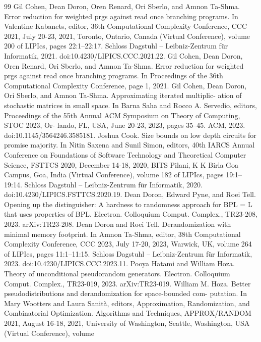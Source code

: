 \documentclass[10pt,a4paper]{article}
\begin{document}
\begin{thebibliography}{99}
 Gil Cohen, Dean Doron, Oren Renard, Ori Sberlo, and Amnon Ta-Shma. Error reduction for weighted prgs against read once branching programs. In Valentine Kabanets, editor, 36th Computational Complexity Conference, CCC 2021, July 20-23, 2021, Toronto, Ontario, Canada (Virtual Conference), volume 200 of LIPIcs, pages 22:1–22:17. Schloss Dagstuhl – Leibniz-Zentrum für Informatik, 2021. doi:10.4230/LIPICS.CCC.2021.22.
 Gil Cohen, Dean Doron, Oren Renard, Ori Sberlo, and Amnon Ta-Shma. Error reduction for weighted prgs against read once branching programs. In Proceedings of the 36th Computational Complexity Conference, page 1, 2021.
 Gil Cohen, Dean Doron, Ori Sberlo, and Amnon Ta-Shma. Approximating iterated multiplic- ation of stochastic matrices in small space. In Barna Saha and Rocco A. Servedio, editors, Proceedings of the 55th Annual ACM Symposium on Theory of Computing, STOC 2023, Or- lando, FL, USA, June 20-23, 2023, pages 35–45. ACM, 2023. doi:10.1145/3564246.3585181.
 Joshua Cook. Size bounds on low depth circuits for promise majority. In Nitin Saxena and Sunil Simon, editors, 40th IARCS Annual Conference on Foundations of Software Technology and Theoretical Computer Science, FSTTCS 2020, December 14-18, 2020, BITS Pilani, K K Birla Goa Campus, Goa, India (Virtual Conference), volume 182 of LIPIcs, pages 19:1–19:14. Schloss Dagstuhl – Leibniz-Zentrum für Informatik, 2020. doi:10.4230/LIPICS.FSTTCS.2020.19.
 Dean Doron, Edward Pyne, and Roei Tell. Opening up the distinguisher: A hardness to randomness approach for BPL = L that uses properties of BPL. Electron. Colloquium Comput. Complex., TR23-208, 2023. arXiv:TR23-208.
 Dean Doron and Roei Tell. Derandomization with minimal memory footprint. In Amnon Ta-Shma, editor, 38th Computational Complexity Conference, CCC 2023, July 17-20, 2023, Warwick, UK, volume 264 of LIPIcs, pages 11:1–11:15. Schloss Dagstuhl – Leibniz-Zentrum für Informatik, 2023. doi:10.4230/LIPICS.CCC.2023.11.
 Pooya Hatami and William Hoza. Theory of unconditional pseudorandom generators. Electron. Colloquium Comput. Complex., TR23-019, 2023. arXiv:TR23-019.
 William M. Hoza. Better pseudodistributions and derandomization for space-bounded com- putation. In Mary Wootters and Laura Sanità, editors, Approximation, Randomization, and Combinatorial Optimization. Algorithms and Techniques, APPROX/RANDOM 2021, August 16-18, 2021, University of Washington, Seattle, Washington, USA (Virtual Conference), volume

\end{thebibliography}
\end{document}

